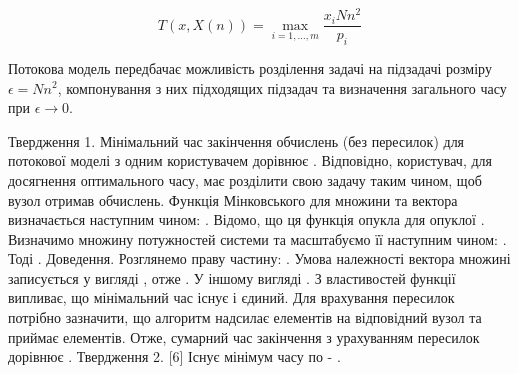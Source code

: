 \begin{equation}
	\label{eq:total_time_general}
	T(x,X(n)) = \max\limits_{i=1,\ldots,m}{\frac{x_i N n^2}{p_i}}
\end{equation}

Потокова модель передбачає можливість розділення задачі на підзадачі розміру $\epsilon = N n^2$, компонування з них підходящих підзадач та визначення загального часу при  $\epsilon \longrightarrow 0$.

Твердження 1.
Мінімальний час закінчення обчислень (без пересилок) для потокової моделі з одним користувачем дорівнює  . Відповідно, користувач, для досягнення оптимального часу, має розділити свою задачу таким чином, щоб  вузол   отримав   обчислень. 
Функція Мінковського для множини   та вектора   визначається наступним чином:
.
Відомо, що ця функція опукла для опуклої  .
Визначимо множину потужностей системи   та масштабуємо її наступним чином:
.
Тоді  . 
Доведення. Розглянемо праву частину: . Умова належності вектора   множині   записується у вигляді  , отже  .  У іншому вигляді  . З властивостей функції   випливає, що мінімальний час   існує і єдиний. Для врахування пересилок потрібно зазначити, що алгоритм надсилає   елементів на відповідний вузол та приймає   елементів. Отже, сумарний час закінчення з урахуванням пересилок дорівнює 
.
Твердження 2. [6] Існує мінімум часу по   -  . 

